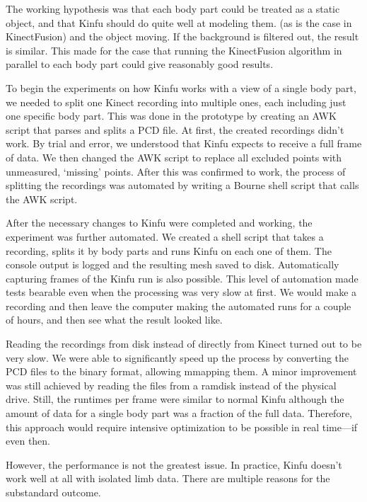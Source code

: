 The working hypothesis was that each body part could be treated as a static object, and that Kinfu should do quite well at modeling them.  (as is the case in KinectFusion) and the object moving. If the background is filtered out, the result is similar. This made for the case that running the KinectFusion algorithm in parallel to each body part could give reasonably good results.

To begin the experiments on how Kinfu works with a view of a single body part, we needed to split one Kinect recording into multiple ones, each including just one specific body part. This was done in the prototype by creating an AWK script that parses and splits a PCD file. At first, the created recordings didn't work. By trial and error, we understood that Kinfu expects to receive a full frame of data. We then changed the AWK script to replace all excluded points with unmeasured, `missing' points. After this was confirmed to work, the process of splitting the recordings was automated by writing a Bourne shell script that calls the AWK script.


After the necessary changes to Kinfu were completed and working, the experiment was further automated. We created a shell script that takes a recording, splits it by body parts and runs Kinfu on each one of them. The console output is logged and the resulting mesh saved to disk. Automatically capturing frames of the Kinfu run is also possible. This level of automation made tests bearable even when the processing was very slow at first. We would make a recording and then leave the computer making the automated runs for a couple of hours, and then see what the result looked like.

Reading the recordings from disk instead of directly from Kinect turned out to be very slow. We were able to significantly speed up the process by converting the PCD files to the binary format, allowing mmapping them. A minor improvement was still achieved by reading the files from a ramdisk instead of the physical drive. Still, the runtimes per frame were similar to normal Kinfu although the amount of data for a single body part was a fraction of the full data. Therefore, this approach would require intensive optimization to be possible in real time---if even then.

However, the performance is not the greatest issue. In practice, Kinfu doesn't work well at all with isolated limb data. There are multiple reasons for the substandard outcome.

